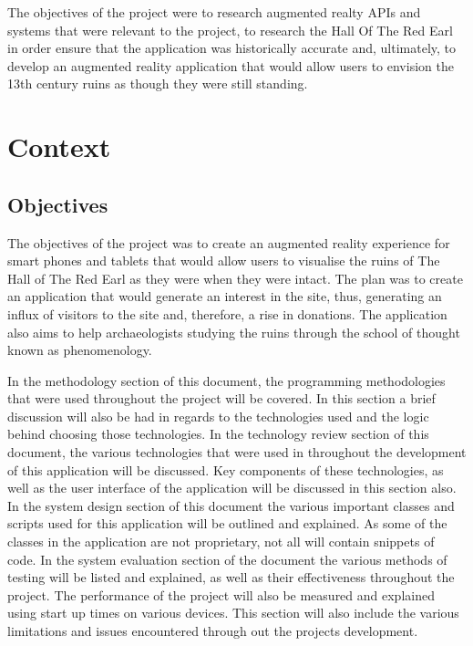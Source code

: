 The objectives of the project were to research augmented realty APIs and systems that were relevant to the project, to research the Hall Of The Red Earl in order ensure that the application was historically accurate and, ultimately, to develop an augmented reality application that would allow users to envision the 13th century ruins as though they were still standing. 
\chapter{Context}
\section{Objectives}
The objectives of the project was to create an augmented reality experience for smart phones and tablets that would allow users to visualise the ruins of The Hall of The Red Earl as they were when they were intact.
The plan was to create an application that would generate an interest in the site, thus, generating an influx of visitors to the site and, therefore, a rise in donations.
The application also aims to help archaeologists studying the ruins through the school of thought known as phenomenology.

In the methodology section of this document, the programming methodologies that were used throughout the project will be covered. In this section a brief discussion will also be had in regards to the technologies used and the logic behind choosing those technologies.
In the technology review section of this document,  the various technologies that were used in throughout the development of this application will be discussed. Key components of these technologies, as well as the user interface of the application will be discussed in this section also.
In the system design section of this document the various important classes and scripts used for this application will be outlined and explained. As some of the classes in the application are not proprietary, not all will contain snippets of code.
In the system evaluation section of the document the various methods of testing will be listed and explained, as well as their effectiveness throughout the project. The performance of the project will also be measured and explained using start up times on various devices. This section will also include the various limitations and issues encountered through out the projects development.

